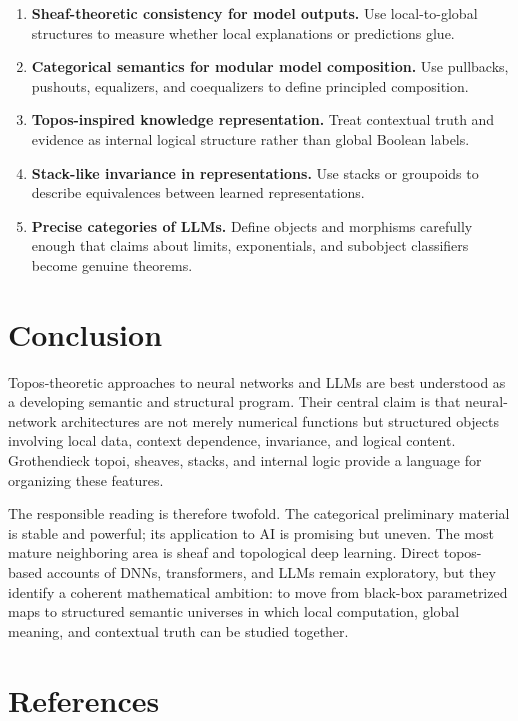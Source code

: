 \documentclass[11pt]{article}
\begin{document}
\begin{enumerate}
\item \textbf{Sheaf-theoretic consistency for model outputs.} Use local-to-global
structures to measure whether local explanations or predictions glue.

\item \textbf{Categorical semantics for modular model composition.} Use pullbacks,
pushouts, equalizers, and coequalizers to define principled composition.

\item \textbf{Topos-inspired knowledge representation.} Treat contextual truth and
evidence as internal logical structure rather than global Boolean labels.

\item \textbf{Stack-like invariance in representations.} Use stacks or groupoids to
describe equivalences between learned representations.

\item \textbf{Precise categories of LLMs.} Define objects and morphisms carefully enough
that claims about limits, exponentials, and subobject classifiers become genuine theorems.

\end{enumerate}

\section{Conclusion}

Topos-theoretic approaches to neural networks and LLMs are best understood as a developing semantic and structural program. Their central claim is that neural-network architectures are not merely numerical functions but structured objects involving local data, context dependence, invariance, and logical content. Grothendieck topoi, sheaves, stacks, and internal logic provide a language for organizing these features.


The responsible reading is therefore twofold. The categorical preliminary material is stable and powerful; its application to AI is promising but uneven. The most mature neighboring area is sheaf and topological deep learning. Direct topos-based accounts of DNNs, transformers, and LLMs remain exploratory, but they identify a coherent mathematical ambition: to move from black-box parametrized maps to structured semantic universes in which local computation, global meaning, and contextual truth can be studied together.


\section{References}
\end{document}
